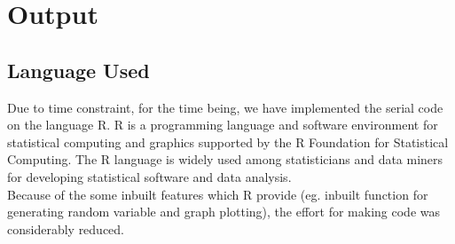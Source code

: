 \documentclass[10pt,a4paper]{article}
\begin{document}
\section{Output}
\subsection{Language Used}
Due to time constraint, for the time being, we have implemented the serial code on the language R. R is a programming language and software environment for statistical computing and graphics supported by the R Foundation for Statistical Computing. The R language is widely used among statisticians and data miners for developing statistical software and data analysis.\\
Because of the some inbuilt features which R provide (eg. inbuilt function for generating random variable and graph plotting), the effort for making code was considerably reduced.
\end{document}
